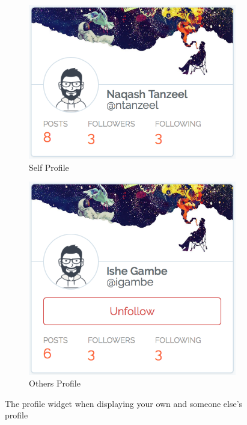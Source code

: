 \begin{figure}[H]
	\centering
	\begin{subfigure}[b]{0.5\linewidth}
		\includegraphics[width=1\textwidth]{Images/Design/UI/Widgets/Profile_Self}
		\caption{Self Profile}
		\label{fig:ProfileWidget_Self}
	\end{subfigure}
	\begin{subfigure}[b]{0.4\linewidth}
		\includegraphics[width=1\textwidth]{Images/Design/UI/Widgets/Profile_Other}
		\caption{Others Profile}
		\label{fig:ProfileWidget_Other}
	\end{subfigure}
	\caption{The profile widget when displaying your own and someone else's profile}
	\label{fig:ProfileWidget}
\end{figure}


